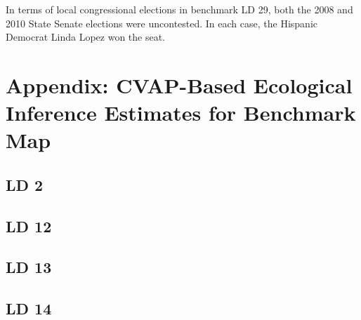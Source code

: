 \documentclass[12pt]{article}
\begin{document}
In terms of local congressional elections in benchmark LD 29, both the 2008 and 2010 State Senate elections were uncontested. In each case, the Hispanic Democrat Linda Lopez won the seat.

\clearpage
\appendix

\section{Appendix: CVAP-Based Ecological Inference Estimates for Benchmark Map}

\subsection{LD 2}









\clearpage

\subsection{LD 12}







\clearpage
\begin{landscape}

\end{landscape}
\clearpage



\clearpage


\subsection{LD 13}







\clearpage

\subsection{LD 14}
\end{document}
